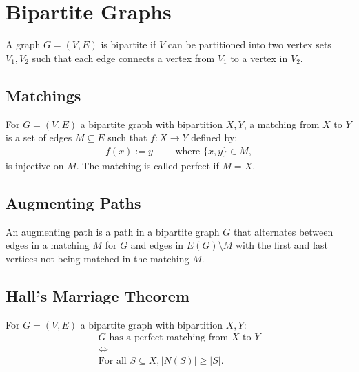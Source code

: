 \section{Bipartite Graphs}

A graph $G = (V, E)$ is bipartite if $V$ can be partitioned into
two vertex sets $V_1, V_2$ such that each edge connects a vertex
from $V_1$ to a vertex in $V_2$.

\subsection{Matchings}

For $G = (V, E)$ a bipartite graph with bipartition $X, Y$,
a matching from $X$ to $Y$ is a set of edges $M \subseteq E$
such that $f : X \to Y$ defined by: \begin{gather*}
  f(x) := y \qquad \text{ where } \{x, y\} \in M,
\end{gather*} is injective on $M$. The matching is called perfect
if $M = X$.

\subsection{Augmenting Paths}

An augmenting path is a path in a bipartite graph $G$ that alternates between
edges in a matching $M$ for $G$ and edges in $E(G) \setminus M$ with the first
and last vertices not being matched in the matching $M$. 

\subsection{Hall's Marriage Theorem}

For $G = (V, E)$ a bipartite graph with bipartition $X, Y$: \begin{gather*}
  G \text{ has a perfect matching from } X \text{ to } Y \\
  \Longleftrightarrow \\
  \text{For all } S \subseteq X, |N(S)| \geq |S|.
\end{gather*}